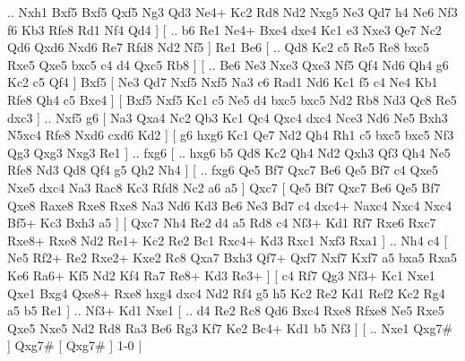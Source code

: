 .. Nxh1  Bxf5 Bxf5  Qxf5 Ng3  Qd3 Ne4+  Kc2 Rd8  Nd2 Nxg5  Ne3 Qd7  h4 Ne6  Nf3 f6  Kb3 Rfe8  Rd1 Nf4  Qd4   ]  [ .. b6  Re1 Ne4+  Bxe4 dxe4  Kc1 e3  Nxe3 Qe7  Nc2 Qd6  Qxd6 Nxd6  Re7 Rfd8  Nd2 Nf5   ]  Re1   Be6 [ .. Qd8  Kc2 c5  Re5 Re8  bxc5 Rxe5  Qxe5 bxc5  c4 d4  Qxc5 Rb8   ]  [ .. Be6  Ne3 Nxe3  Qxe3 Nf5  Qf4 Nd6  Qh4 g6  Kc2 c5  Qf4   ]  Bxf5 [  Ne3 Qd7  Nxf5 Nxf5  Na3 c6  Rad1 Nd6  Kc1 f5  c4 Ne4  Kb1 Rfe8  Qh4 c5  Bxe4   ]  [  Bxf5 Nxf5  Kc1 c5  Ne5 d4  bxc5 bxc5  Nd2 Rb8  Nd3 Qc8  Re5 dxc3   ] .. Nxf5    g6 [  Na3 Qxa4  Nc2 Qb3  Kc1 Qc4  Qxc4 dxc4  Nce3 Nd6  Ne5 Bxh3  N5xc4 Rfe8  Nxd6 cxd6  Kd2   ]  [  g6 hxg6  Kc1 Qe7  Nd2 Qh4  Rh1 c5  bxc5 bxc5  Nf3 Qg3  Qxg3 Nxg3  Re1   ] .. fxg6 [ .. hxg6  b5 Qd8  Kc2 Qh4  Nd2 Qxh3  Qf3 Qh4  Ne5 Rfe8  Nd3 Qd8  Qf4 g5  Qh2 Nh4   ]  [ .. fxg6  Qe5 Bf7  Qxc7 Be6  Qe5 Bf7  c4 Qxe5  Nxe5 dxc4  Na3 Rac8  Kc3 Rfd8  Nc2 a6  a5   ]  Qxc7 [  Qe5 Bf7  Qxc7 Be6  Qe5 Bf7  Qxe8 Raxe8  Rxe8 Rxe8  Na3 Nd6  Kd3 Be6  Ne3 Bd7  c4 dxc4+  Naxc4 Nxc4  Nxc4 Bf5+  Kc3 Bxh3  a5   ]  [  Qxc7 Nh4  Re2 d4  a5 Rd8  c4 Nf3+  Kd1 Rf7  Rxe6 Rxc7  Rxe8+ Rxe8  Nd2 Re1+  Kc2 Re2  Bc1 Rxc4+  Kd3 Rxc1  Nxf3 Rxa1   ] .. Nh4    c4 [  Ne5 Rf2+  Re2 Rxe2+  Kxe2 Rc8  Qxa7 Bxh3  Qf7+ Qxf7  Nxf7 Kxf7  a5 bxa5  Rxa5 Ke6  Ra6+ Kf5  Nd2 Kf4  Ra7 Re8+  Kd3 Re3+   ]  [  c4 Rf7  Qg3 Nf3+  Kc1 Nxe1  Qxe1 Bxg4  Qxe8+ Rxe8  hxg4 dxc4  Nd2 Rf4  g5 h5  Kc2 Re2  Kd1 Ref2  Kc2 Rg4  a5 b5  Re1   ] .. Nf3+    Kd1   Nxe1    [ .. d4  Re2 Rc8  Qd6 Bxc4  Rxe8 Rfxe8  Ne5 Rxe5  Qxe5 Nxe5  Nd2 Rd8  Ra3 Be6  Rg3 Kf7  Ke2 Bc4+  Kd1 b5  Nf3   ]  [ .. Nxe1  Qxg7#   ]  Qxg7#    [  Qxg7#   ] 1-0  |
